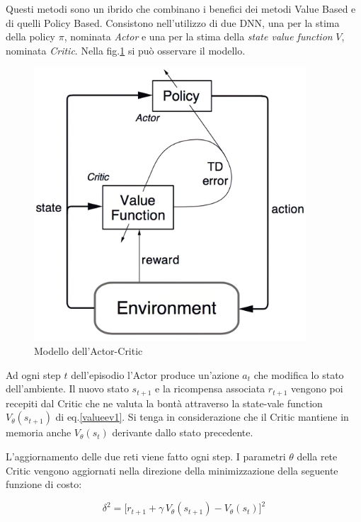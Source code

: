Questi metodi sono un ibrido che combinano i benefici dei metodi Value Based e di quelli Policy Based. Consistono nell'utilizzo di due DNN, una per la stima della policy $\pi$, nominata \textit{Actor} e una per la stima della \textit{state value function} $V$, nominata \textit{Critic}. Nella fig.\ref{fig:actor-critic} si può osservare il modello.
\newline

\begin{figure}[hb]
    \centering
    \includegraphics[width = 4in]{Figures/Chapter2/actor-critic_model4x.jpg}
    \caption{Modello dell'Actor-Critic}
    \label{fig:actor-critic}
\end{figure}

Ad ogni step $t$ dell'episodio l'Actor produce un'azione $a_t$ che modifica lo stato dell'ambiente. Il nuovo stato $s_{t+1}$ e la ricompensa associata $r_{t+1}$ vengono poi recepiti dal Critic che ne valuta la bontà attraverso la state-vale function $V_{\theta}(s_{t+1})$ di eq.\ref{valueev1}. Si tenga in considerazione che il Critic mantiene in memoria anche $V_{\theta}(s_t)$ derivante dallo stato precedente.
\newline

L'aggiornamento delle due reti viene fatto ogni step. I parametri $\theta$ della rete Critic vengono aggiornati nella direzione della minimizzazione della seguente funzione di costo:

\begin{equation}
	\delta^2 = \Big[ r_{t+1} + \gamma \, V_{\theta}(s_{t+1}) - V_{\theta}(s_t) \Big]^2
\end{equation}

